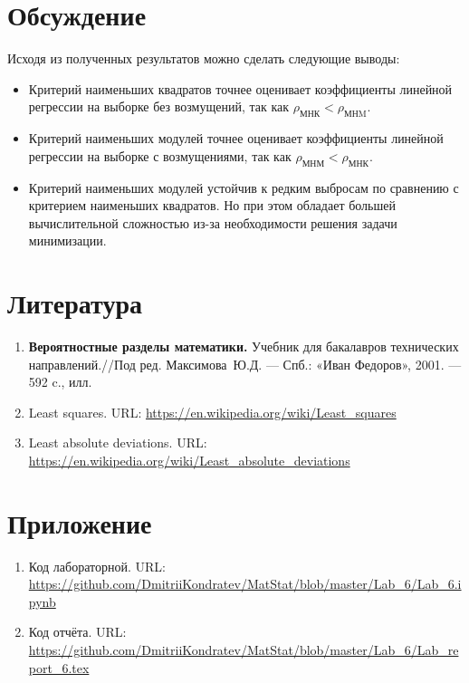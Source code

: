 \documentclass[12pt,a4paper]{article}
\begin{document}
	\section{Обсуждение}
	Исходя из полученных результатов можно сделать следующие выводы:
	\begin{itemize}
		\item  Критерий наименьших квадратов точнее оценивает коэффициенты линейной регрессии на выборке без возмущений, так как $\rho_\text{МНК}<\rho_\text{МНM}$.
		
		\item Критерий наименьших модулей точнее оценивает коэффициенты линейной регрессии на выборке с возмущениями, так как $\rho_\text{МНМ}<\rho_\text{МНК}$.
		
		\item Критерий наименьших модулей устойчив к редким выбросам по сравнению с критерием наименьших квадратов. Но при этом обладает большей вычислительной сложностью из-за необходимости решения задачи минимизации.
	\end{itemize}
	
	\section{Литература}
	\begin{enumerate}
		\item \label{Book_1} \textbf{Вероятностные разделы математики.} Учебник для бакалавров технических направлений.//Под ред. Максимова~Ю.Д. --- Спб.: «Иван Федоров», 2001. --- 592 c., илл.
		
		\item Least squares. URL: \url{https://en.wikipedia.org/wiki/Least_squares}
		
		\item Least absolute deviations. URL: \url{https://en.wikipedia.org/wiki/Least_absolute_deviations}
	\end{enumerate}

	\section{Приложение}
	\begin{enumerate}
		\item Код лабораторной. URL: \url{https://github.com/DmitriiKondratev/MatStat/blob/master/Lab_6/Lab_6.ipynb}
		
		\item Код отчёта. URL: \url{https://github.com/DmitriiKondratev/MatStat/blob/master/Lab_6/Lab_report_6.tex}
	\end{enumerate}
\end{document}
